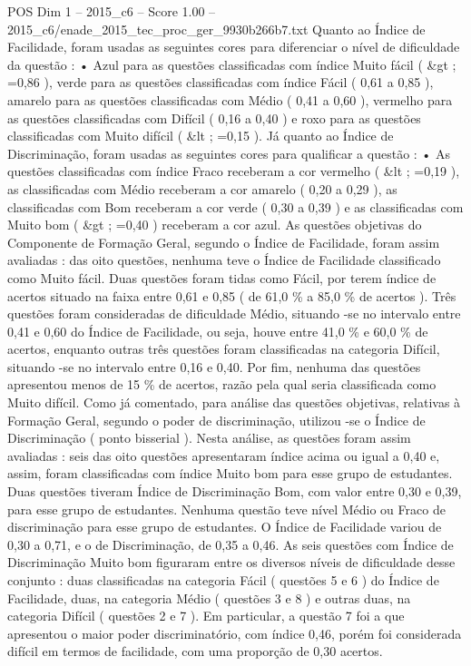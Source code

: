 \begin{textsample}{POS Dim 1 – 2015\_c6 – Score 1.00 – 2015\_c6/enade\_2015\_tec\_proc\_ger\_9930b266b7.txt}
Quanto ao Índice de Facilidade, foram usadas as seguintes cores para diferenciar o nível de dificuldade da questão : • Azul para as questões classificadas com índice Muito fácil ( \&gt ; =0,86 ), verde para as questões classificadas com índice Fácil ( 0,61 a 0,85 ), amarelo para as questões classificadas com Médio ( 0,41 a 0,60 ), vermelho para as questões classificadas com Difícil ( 0,16 a 0,40 ) e roxo para as questões classificadas com Muito difícil ( \&lt ; =0,15 ).
Já quanto ao Índice de Discriminação, foram usadas as seguintes cores para qualificar a questão : • As questões classificadas com índice Fraco receberam a cor vermelho ( \&lt ; =0,19 ), as classificadas com Médio receberam a cor amarelo ( 0,20 a 0,29 ), as classificadas com Bom receberam a cor verde ( 0,30 a 0,39 ) e as classificadas com Muito bom ( \&gt ; =0,40 ) receberam a cor azul.
As questões objetivas do Componente de Formação Geral, segundo o Índice de Facilidade, foram assim avaliadas : das oito questões, nenhuma teve o Índice de Facilidade classificado como Muito fácil.
Duas questões foram tidas como Fácil, por terem índice de acertos situado na faixa entre 0,61 e 0,85 ( de 61,0 \% a 85,0 \% de acertos ).
Três questões foram consideradas de dificuldade Médio, situando -se no intervalo entre 0,41 e 0,60 do Índice de Facilidade, ou seja, houve entre 41,0 \% e 60,0 \% de acertos, enquanto outras três questões foram classificadas na categoria Difícil, situando -se no intervalo entre 0,16 e 0,40.
Por fim, nenhuma das questões apresentou menos de 15 \% de acertos, razão pela qual seria classificada como Muito difícil.
Como já comentado, para análise das questões objetivas, relativas à Formação Geral, segundo o poder de discriminação, utilizou -se o Índice de Discriminação ( ponto bisserial ).
Nesta análise, as questões foram assim avaliadas : seis das oito questões apresentaram índice acima ou igual a 0,40 e, assim, foram classificadas com índice Muito bom para esse grupo de estudantes.
Duas questões tiveram Índice de Discriminação Bom, com valor entre 0,30 e 0,39, para esse grupo de estudantes.
Nenhuma questão teve nível Médio ou Fraco de discriminação para esse grupo de estudantes.
O Índice de Facilidade variou de 0,30 a 0,71, e o de Discriminação, de 0,35 a 0,46.
As seis questões com Índice de Discriminação Muito bom figuraram entre os diversos níveis de dificuldade desse conjunto : duas classificadas na categoria Fácil ( questões 5 e 6 ) do Índice de Facilidade, duas, na categoria Médio ( questões 3 e 8 ) e outras duas, na categoria Difícil ( questões 2 e 7 ).
Em particular, a questão 7 foi a que apresentou o maior poder discriminatório, com índice 0,46, porém foi considerada difícil em termos de facilidade, com uma proporção de 0,30 acertos.

\end{textsample}
